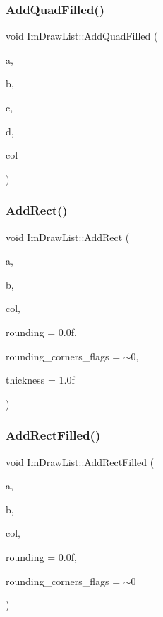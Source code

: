 \subsubsection{\texorpdfstring{Add\+Quad\+Filled()}{AddQuadFilled()}}
{\footnotesize\ttfamily void Im\+Draw\+List\+::\+Add\+Quad\+Filled (\begin{DoxyParamCaption}\item[{const \hyperlink{struct_im_vec2}{Im\+Vec2} \&}]{a,  }\item[{const \hyperlink{struct_im_vec2}{Im\+Vec2} \&}]{b,  }\item[{const \hyperlink{struct_im_vec2}{Im\+Vec2} \&}]{c,  }\item[{const \hyperlink{struct_im_vec2}{Im\+Vec2} \&}]{d,  }\item[{Im\+U32}]{col }\end{DoxyParamCaption})}

\hypertarget{struct_im_draw_list_a6738c7d0b696273a37808554e1f15a0a}{}\label{struct_im_draw_list_a6738c7d0b696273a37808554e1f15a0a} 
\subsubsection{\texorpdfstring{Add\+Rect()}{AddRect()}}
{\footnotesize\ttfamily void Im\+Draw\+List\+::\+Add\+Rect (\begin{DoxyParamCaption}\item[{const \hyperlink{struct_im_vec2}{Im\+Vec2} \&}]{a,  }\item[{const \hyperlink{struct_im_vec2}{Im\+Vec2} \&}]{b,  }\item[{Im\+U32}]{col,  }\item[{float}]{rounding = {\ttfamily 0.0f},  }\item[{int}]{rounding\+\_\+corners\+\_\+flags = {\ttfamily $\sim$0},  }\item[{float}]{thickness = {\ttfamily 1.0f} }\end{DoxyParamCaption})}

\hypertarget{struct_im_draw_list_a1fa7c9165958909bba53c9740a607872}{}\label{struct_im_draw_list_a1fa7c9165958909bba53c9740a607872} 
\subsubsection{\texorpdfstring{Add\+Rect\+Filled()}{AddRectFilled()}}
{\footnotesize\ttfamily void Im\+Draw\+List\+::\+Add\+Rect\+Filled (\begin{DoxyParamCaption}\item[{const \hyperlink{struct_im_vec2}{Im\+Vec2} \&}]{a,  }\item[{const \hyperlink{struct_im_vec2}{Im\+Vec2} \&}]{b,  }\item[{Im\+U32}]{col,  }\item[{float}]{rounding = {\ttfamily 0.0f},  }\item[{int}]{rounding\+\_\+corners\+\_\+flags = {\ttfamily $\sim$0} }\end{DoxyParamCaption})}

